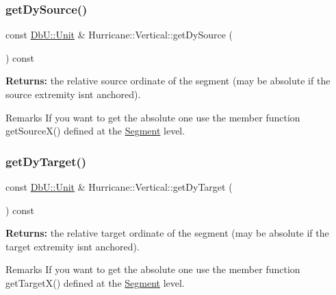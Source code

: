 \subsubsection{\texorpdfstring{get\+Dy\+Source()}{getDySource()}}
{\footnotesize\ttfamily const \mbox{\hyperlink{group__DbUGroup_ga4fbfa3e8c89347af76c9628ea06c4146}{Db\+U\+::\+Unit}} \& Hurricane\+::\+Vertical\+::get\+Dy\+Source (\begin{DoxyParamCaption}{ }\end{DoxyParamCaption}) const\hspace{0.3cm}{\ttfamily [inline]}}

{\bfseries Returns\+:} the relative source ordinate of the segment (may be absolute if the source extremity isn\textquotesingle{}t anchored).

\begin{DoxyRemark}{Remarks}
If you want to get the absolute one use the member function get\+Source\+X() defined at the \mbox{\hyperlink{classHurricane_1_1Segment}{Segment}} level. 
\end{DoxyRemark}
\mbox{\label{classHurricane_1_1Vertical_af9ae34d224436db7c4c30f18fbd8f9a3}} 
\subsubsection{\texorpdfstring{get\+Dy\+Target()}{getDyTarget()}}
{\footnotesize\ttfamily const \mbox{\hyperlink{group__DbUGroup_ga4fbfa3e8c89347af76c9628ea06c4146}{Db\+U\+::\+Unit}} \& Hurricane\+::\+Vertical\+::get\+Dy\+Target (\begin{DoxyParamCaption}{ }\end{DoxyParamCaption}) const\hspace{0.3cm}{\ttfamily [inline]}}

{\bfseries Returns\+:} the relative target ordinate of the segment (may be absolute if the target extremity isn\textquotesingle{}t anchored).

\begin{DoxyRemark}{Remarks}
If you want to get the absolute one use the member function get\+Target\+X() defined at the \mbox{\hyperlink{classHurricane_1_1Segment}{Segment}} level. 
\end{DoxyRemark}
\mbox{\label{classHurricane_1_1Vertical_aaea60cb8247f4ea837f90a4532901143}} 
